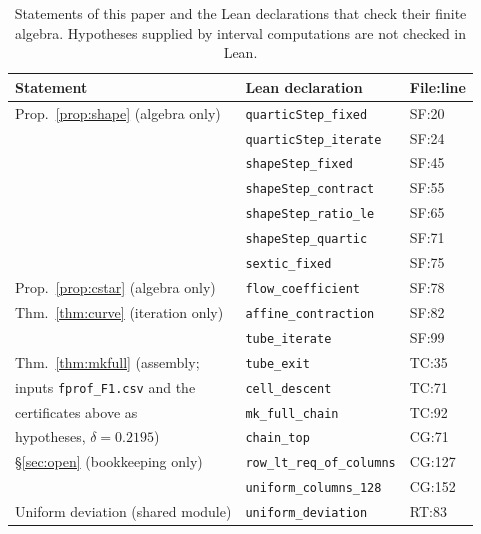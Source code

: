 \documentclass[11pt,a4paper]{article}
\theoremstyle{definition}
\theoremstyle{remark}
\newcommand{\code}[1]{\texttt{#1}}
\begin{document}
\begin{table}[ht]\centering\small
\begin{tabular}{lll}
\toprule
Statement & Lean declaration & File:line \\
\midrule
Prop.~\ref{prop:shape} (algebra only) & \code{quarticStep\_fixed} & SF:20 \\
 & \code{quarticStep\_iterate} & SF:24 \\
 & \code{shapeStep\_fixed} & SF:45 \\
 & \code{shapeStep\_contract} & SF:55 \\
 & \code{shapeStep\_ratio\_le} & SF:65 \\
 & \code{shapeStep\_quartic} & SF:71 \\
 & \code{sextic\_fixed} & SF:75 \\
Prop.~\ref{prop:cstar} (algebra only) & \code{flow\_coefficient} & SF:78 \\
Thm.~\ref{thm:curve} (iteration only) & \code{affine\_contraction} & SF:82 \\
 & \code{tube\_iterate} & SF:99 \\
Thm.~\ref{thm:mkfull} (assembly; & \code{tube\_exit} & TC:35 \\
\quad inputs \code{fprof\_F1.csv} and the & \code{cell\_descent} & TC:71 \\
\quad certificates above as & \code{mk\_full\_chain} & TC:92 \\
\quad hypotheses, $\delta=0.2195$) & \code{chain\_top} & CG:71 \\
\S\ref{sec:open} (bookkeeping only) & \code{row\_lt\_req\_of\_columns} & CG:127 \\
 & \code{uniform\_columns\_128} & CG:152 \\
Uniform deviation (shared module) & \code{uniform\_deviation} & RT:83 \\
\bottomrule
\end{tabular}
\caption{Statements of this paper and the Lean declarations that check their finite algebra. Hypotheses supplied by interval computations are not checked in Lean.}\label{tab:corr}
\end{table}
\end{document}
